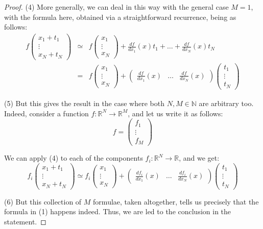\documentclass[12pt]{amsbook}
\begin{document}
\begin{proof}
(4) More generally, we can deal in this way with the general case $M=1$, with the formula here, obtained via a straightforward recurrence, being as follows:
\begin{eqnarray*}
f\begin{pmatrix}x_1+t_1\\ \vdots\\ x_N+t_N\end{pmatrix}
&\simeq&f\begin{pmatrix}x_1\\ \vdots\\ x_N\end{pmatrix}+\frac{df}{dx_1}(x)t_1+\ldots+\frac{df}{dx_N}(x)t_N\\
&=&f\begin{pmatrix}x_1\\ \vdots\\ x_N\end{pmatrix}+
\begin{pmatrix}\frac{df}{dx_1}(x)&\ldots&\frac{df}{dx_N}(x)\end{pmatrix}
\begin{pmatrix}t_1\\ \vdots\\ t_N\end{pmatrix}
\end{eqnarray*}

(5) But this gives the result in the case where both $N,M\in\mathbb N$ are arbitrary too. Indeed, consider a function $f:\mathbb R^N\to\mathbb R^M$, and let us write it as follows:
$$f=\begin{pmatrix}f_1\\ \vdots\\ f_M\end{pmatrix}$$

We can apply (4) to each of the components $f_i:\mathbb R^N\to\mathbb R$, and we get:
$$f_i\begin{pmatrix}x_1+t_1\\ \vdots\\ x_N+t_N\end{pmatrix}
\simeq f_i\begin{pmatrix}x_1\\ \vdots\\ x_N\end{pmatrix}+
\begin{pmatrix}\frac{df_i}{dx_1}(x)&\ldots&\frac{df_i}{dx_N}(x)\end{pmatrix}
\begin{pmatrix}t_1\\ \vdots\\ t_N\end{pmatrix}$$

(6) But this collection of $M$ formulae, taken altogether, tells us precisely that the formula in (1) happens indeed. Thus, we are led to the conclusion in the statement.
\end{proof}
\end{document}
